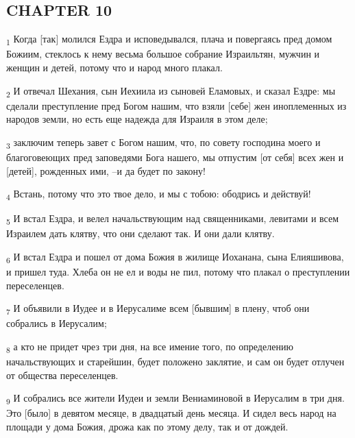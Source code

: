 \subsection{CHAPTER 10}
\begin{tcolorbox}
\textsubscript{1} Когда [так] молился Ездра и исповедывался, плача и повергаясь пред домом Божиим, стеклось к нему весьма большое собрание Израильтян, мужчин и женщин и детей, потому что и народ много плакал.
\end{tcolorbox}
\begin{tcolorbox}
\textsubscript{2} И отвечал Шехания, сын Иехиила из сыновей Еламовых, и сказал Ездре: мы сделали преступление пред Богом нашим, что взяли [себе] жен иноплеменных из народов земли, но есть еще надежда для Израиля в этом деле;
\end{tcolorbox}
\begin{tcolorbox}
\textsubscript{3} заключим теперь завет с Богом нашим, что, по совету господина моего и благоговеющих пред заповедями Бога нашего, мы отпустим [от себя] всех жен и [детей], рожденных ими, --и да будет по закону!
\end{tcolorbox}
\begin{tcolorbox}
\textsubscript{4} Встань, потому что это твое дело, и мы с тобою: ободрись и действуй!
\end{tcolorbox}
\begin{tcolorbox}
\textsubscript{5} И встал Ездра, и велел начальствующим над священниками, левитами и всем Израилем дать клятву, что они сделают так. И они дали клятву.
\end{tcolorbox}
\begin{tcolorbox}
\textsubscript{6} И встал Ездра и пошел от дома Божия в жилище Иоханана, сына Елияшивова, и пришел туда. Хлеба он не ел и воды не пил, потому что плакал о преступлении переселенцев.
\end{tcolorbox}
\begin{tcolorbox}
\textsubscript{7} И объявили в Иудее и в Иерусалиме всем [бывшим] в плену, чтоб они собрались в Иерусалим;
\end{tcolorbox}
\begin{tcolorbox}
\textsubscript{8} а кто не придет чрез три дня, на все имение того, по определению начальствующих и старейшин, будет положено заклятие, и сам он будет отлучен от общества переселенцев.
\end{tcolorbox}
\begin{tcolorbox}
\textsubscript{9} И собрались все жители Иудеи и земли Вениаминовой в Иерусалим в три дня. Это [было] в девятом месяце, в двадцатый день месяца. И сидел весь народ на площади у дома Божия, дрожа как по этому делу, так и от дождей.
\end{tcolorbox}
